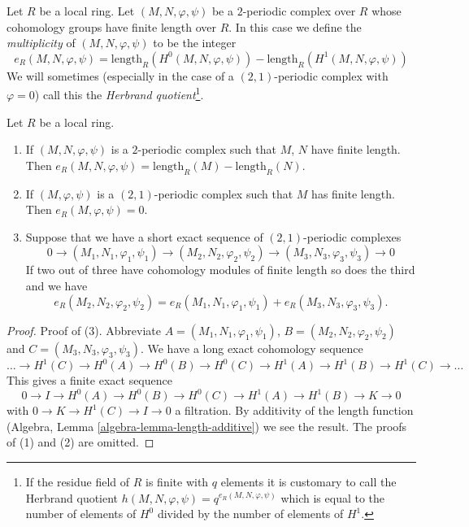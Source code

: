 \begin{definition}
\label{definition-periodic-length}
Let $R$ be a local ring.
Let $(M, N, \varphi, \psi)$ be a $2$-periodic complex over $R$
whose cohomology groups have finite length over $R$.
In this case we define the {\it multiplicity} of $(M, N, \varphi, \psi)$
to be the integer
$$
e_R(M, N, \varphi, \psi) =
\text{length}_R(H^0(M, N, \varphi, \psi))
-
\text{length}_R(H^1(M, N, \varphi, \psi))
$$
We will sometimes (especially in the case of a $(2, 1)$-periodic complex with
$\varphi = 0$) call this the {\it Herbrand quotient}\footnote{If the residue
field of $R$ is finite with $q$ elements
it is customary to call the Herbrand quotient
$h(M, N, \varphi, \psi) = q^{e_R(M, N, \varphi, \psi)}$ which is equal to
the number of elements of $H^0$ divided by the number of elements of
$H^1$.}.
\end{definition}

\begin{lemma}
\label{lemma-periodic-length}
Let $R$ be a local ring.
\begin{enumerate}
\item If $(M, N, \varphi, \psi)$ is a $2$-periodic complex
such that $M$, $N$ have finite length. Then
$e_R(M, N, \varphi, \psi) = \text{length}_R(M) - \text{length}_R(N)$.
\item If $(M, \varphi, \psi)$ is a $(2, 1)$-periodic complex
such that $M$ has finite length. Then
$e_R(M, \varphi, \psi) = 0$.
\item Suppose that we have a short exact sequence of
$(2, 1)$-periodic complexes
$$
0 \to (M_1, N_1, \varphi_1, \psi_1)
\to (M_2, N_2, \varphi_2, \psi_2)
\to (M_3, N_3, \varphi_3, \psi_3)
\to 0
$$
If two out of three have cohomology modules of finite length so does
the third and we have
$$
e_R(M_2, N_2, \varphi_2, \psi_2) =
e_R(M_1, N_1, \varphi_1, \psi_1) +
e_R(M_3, N_3, \varphi_3, \psi_3).
$$
\end{enumerate}
\end{lemma}

\begin{proof}
Proof of (3). Abbreviate $A = (M_1, N_1, \varphi_1, \psi_1)$,
$B = (M_2, N_2, \varphi_2, \psi_2)$ and $C = (M_3, N_3, \varphi_3, \psi_3)$.
We have a long exact cohomology sequence
$$
\ldots
\to H^1(C)
\to H^0(A)
\to H^0(B)
\to H^0(C)
\to H^1(A)
\to H^1(B)
\to H^1(C)
\to \ldots
$$
This gives a finite exact sequence
$$
0 \to I
\to H^0(A)
\to H^0(B)
\to H^0(C)
\to H^1(A)
\to H^1(B)
\to K \to 0
$$
with $0 \to K \to H^1(C) \to I \to 0$ a filtration. By additivity of
the length function (Algebra, Lemma \ref{algebra-lemma-length-additive})
we see the result.
The proofs of (1) and (2) are omitted.
\end{proof}

